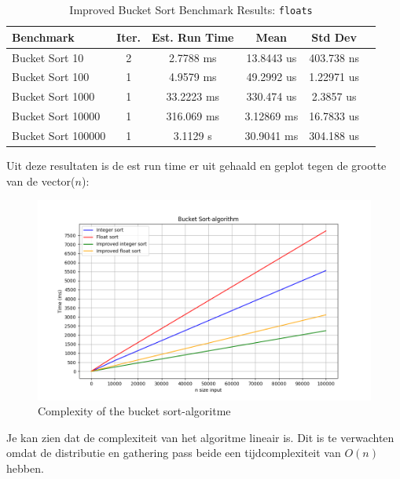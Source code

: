 \documentclass{article}
\begin{document}
\begin{table}[H]
  \caption{Improved Bucket Sort Benchmark Results:  \texttt{floats}}
  \label{tab:floats-detailed-new}
  \begin{tabular*}{\columnwidth}{@{\extracolsep\fill}lccccc}
    \hline
    Benchmark          & Iter. & Est. Run Time & Mean          & Std Dev       \\
    \hline
    Bucket Sort 10     & 2     & 2.7788 ms    & 13.8443 us    & 403.738 ns  \\
    Bucket Sort 100    & 1     & 4.9579 ms    & 49.2992 us    & 1.22971 us  \\
    Bucket Sort 1000   & 1     & 33.2223 ms   & 330.474 us    & 2.3857 us   \\
    Bucket Sort 10000  & 1     & 316.069 ms   & 3.12869 ms    & 16.7833 us  \\
    Bucket Sort 100000 & 1     & 3.1129 s     & 30.9041 ms    & 304.188 us  \\
    \hline
  \end{tabular*}
\end{table}

\newpage
Uit deze resultaten is de est run time er uit gehaald en geplot tegen de grootte van de vector($n$):

\begin{figure}[H]
    \includegraphics[width=1\textwidth]{images/bucket_sort.png}
    \caption{Complexity of the bucket sort-algoritme}
    \label{fig:complexity}
\end{figure}
Je kan zien dat de complexiteit van het algoritme lineair is. Dit is te verwachten omdat de distributie en gathering pass beide een tijdcomplexiteit van \(O(n)\) hebben.
\end{document}
